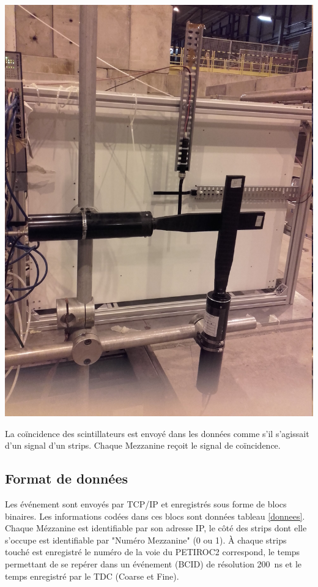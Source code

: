 \marginpar
{
	\centering
	\includegraphics[width=\marginparwidth]{ELE/BigSmallScintillators.jpg}
	\label{smallPM}
}

La coïncidence des scintillateurs est envoyé dans les données comme s'il s'agissait d'un signal d'un strips. Chaque Mezzanine reçoit le signal de coïncidence.
\vspace*{-0.4cm}
\subsection{Format de données}
\vspace*{-0.4cm}
Les événement sont envoyés par TCP/IP et enregistrés sous forme de blocs binaires. Les informations codées dans ces blocs sont données tableau \ref{donnees}. Chaque Mézzanine est identifiable par son adresse IP, le côté des strips dont elle s'occupe est identifiable par "Numéro Mezzanine" (\num{0} ou \num{1}). À chaque strips touché est enregistré le numéro de la voie du PETIROC2 correspond, le temps permettant de se repérer dans un événement (BCID) de résolution \SI{200}{\nano\second} et le temps enregistré par le TDC (Coarse et Fine).

